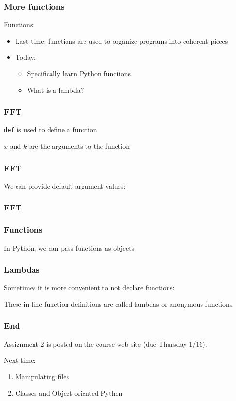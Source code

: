 \documentclass{beamer}
\begin{document}
\begin{frame}
\frametitle{More functions}

Functions:
\begin{itemize}
\setlength{\itemsep}{0.15in}
\item{Last time: functions are used to organize programs into coherent pieces}
\item{Today:
\begin{itemize}
  \setlength{\itemsep}{0.1in}
  \item{Specifically learn Python functions}
  \item{What is a lambda?}
\end{itemize}
}
\end{itemize}

\end{frame}

\begin{frame}
\frametitle{FFT}
\texttt{def} is used to define a function


$x$ and $k$ are the arguments to the function
\end{frame}

\begin{frame}
\frametitle{FFT}

We can provide default argument values:


\end{frame}


\begin{frame}
\frametitle{FFT}


\end{frame}

\begin{frame}
\frametitle{Functions}
In Python, we can pass functions as objects:


\end{frame}

\begin{frame}
\frametitle{Lambdas}

Sometimes it is more convenient to not declare functions:


These in-line function definitions are called lambdas or anonymous functions

\end{frame}

\begin{frame}
\frametitle{End}
Assignment 2 is posted on the course web site (due Thursday 1/16).

\vspace{0.2in}

Next time:
\begin{enumerate}
\setlength{\itemsep}{0.05in}
\item{Manipulating files}
\item{Classes and Object-oriented Python}
\end{enumerate}

\end{frame}
\end{document}
